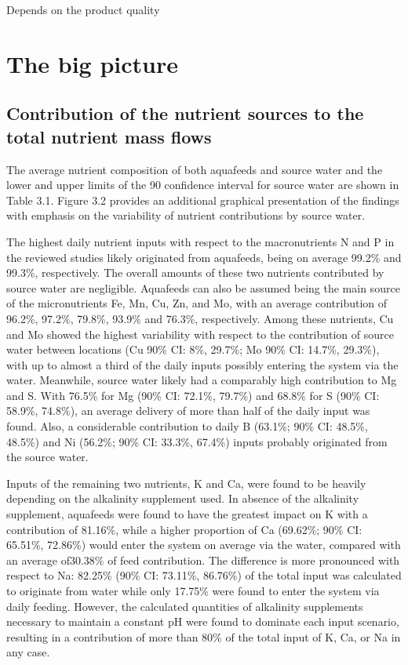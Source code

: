 \documentclass[preprint, 3p,
authoryear]{elsarticle} %
\begin{document}
Depends on the product quality

\hypertarget{the-big-picture}{%
\section{The big picture}\label{the-big-picture}}

\hypertarget{contribution-of-the-nutrient-sources-to-the-total-nutrient-mass-flows}{%
\subsection{Contribution of the nutrient sources to the total nutrient
mass
flows}\label{contribution-of-the-nutrient-sources-to-the-total-nutrient-mass-flows}}

The average nutrient composition of both aquafeeds and source water and
the lower and upper limits of the \SI{90}{\p} confidence interval for
source water are shown in Table 3.1. Figure 3.2 provides an additional
graphical presentation of the findings with emphasis on the variability
of nutrient contributions by source water.

The highest daily nutrient inputs with respect to the macronutrients N
and P in the reviewed studies likely originated from aquafeeds, being on
average 99.2\% and 99.3\%, respectively. The overall amounts of these
two nutrients contributed by source water are negligible. Aquafeeds can
also be assumed being the main source of the micronutrients Fe, Mn, Cu,
Zn, and Mo, with an average contribution of 96.2\%, 97.2\%, 79.8\%,
93.9\% and 76.3\%, respectively. Among these nutrients, Cu and Mo showed
the highest variability with respect to the contribution of source water
between locations (Cu 90\% CI: 8\%, 29.7\%; Mo 90\% CI: 14.7\%, 29.3\%),
with up to almost a third of the daily inputs possibly entering the
system via the water. Meanwhile, source water likely had a comparably
high contribution to Mg and S. With 76.5\% for Mg (90\% CI: 72.1\%,
79.7\%) and 68.8\% for S (90\% CI: 58.9\%, 74.8\%), an average delivery
of more than half of the daily input was found. Also, a considerable
contribution to daily B (63.1\%; 90\% CI: 48.5\%, 48.5\%) and Ni
(56.2\%; 90\% CI: 33.3\%, 67.4\%) inputs probably originated from the
source water.

Inputs of the remaining two nutrients, K and Ca, were found to be
heavily depending on the alkalinity supplement used. In absence of the
alkalinity supplement, aquafeeds were found to have the greatest impact
on K with a contribution of 81.16\%, while a higher proportion of Ca
(69.62\%; 90\% CI: 65.51\%, 72.86\%) would enter the system on average
via the water, compared with an average of30.38\% of feed contribution.
The difference is more pronounced with respect to Na: 82.25\% (90\% CI:
73.11\%, 86.76\%) of the total input was calculated to originate from
water while only 17.75\% were found to enter the system via daily
feeding. However, the calculated quantities of alkalinity supplements
necessary to maintain a constant pH were found to dominate each input
scenario, resulting in a contribution of more than 80\% of the total
input of K, Ca, or Na in any case.
\end{document}
